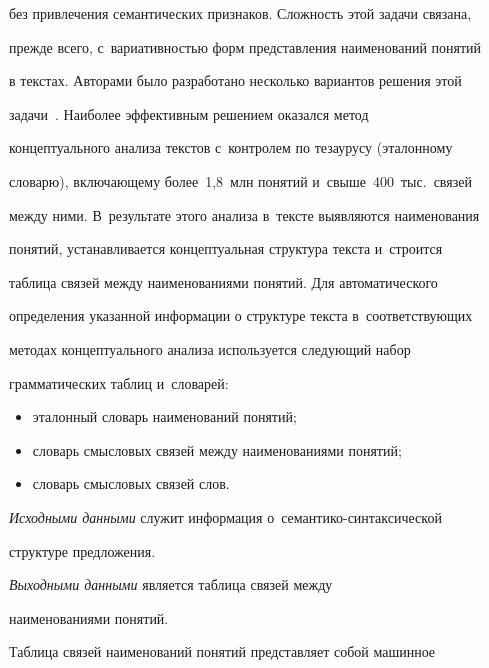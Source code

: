 без привлечения семантических признаков. Сложность этой задачи связана, 


прежде всего, с~вариативностью форм представления наименований понятий 


в текстах. Авторами было разработано несколько вариантов решения этой 


задачи~\cite{3-kl, 5-kl}. Наиболее эффективным решением оказался метод 


концептуального анализа текстов с~контролем по тезаурусу (эталонному 


словарю), включающему более~1,8~млн понятий и~свыше~400~тыс.\ связей 


между ними. В~результате этого анализа в~тексте выявляются наименования 


понятий, устанавливается концептуальная структура текста и~строится 


таблица связей между наименованиями понятий. Для автоматического 


определения указанной информации о структуре текста в~соответствующих 


методах концептуального анализа используется следующий набор 


грамматических таблиц и~словарей:


      \begin{itemize}


  \item эталонный словарь наименований понятий;


  \item словарь смысловых связей между наименованиями понятий;


  \item словарь смысловых связей слов.


  \end{itemize}


  


  \textit{Исходными данными} служит информация о~се\-ман\-ти\-ко-син\-так\-си\-че\-ской 


  струк\-ту\-ре предложения. 


  


  \textit{Выходными данными} является таблица связей между 


наименованиями понятий. 


    


Таблица связей наименований понятий представляет собой машинное 


